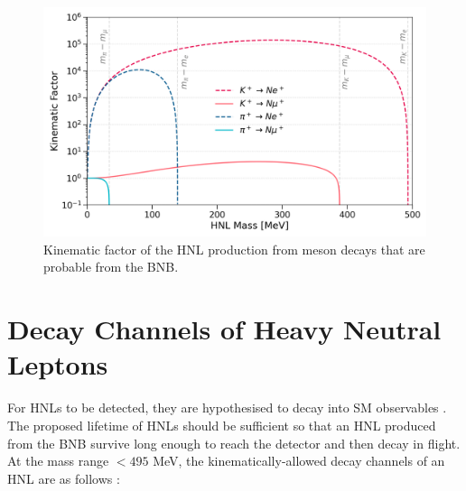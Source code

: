 
\begin{figure}[t] 
\centering    
\includegraphics[width=1.0\textwidth]{kinematics_factor}
\caption[Kinematic Factor of Heavy Neutral Leptons]{
Kinematic factor of the HNL production from meson decays that are probable from the BNB.
}
\label{fig:KinematicsFactor}
\end{figure}

\section{Decay Channels of Heavy Neutral Leptons}
\label{sec2Decay}


For HNLs to be detected, they are hypothesised to decay into SM observables \cite{HNLKelly}.
The proposed lifetime of HNLs should be sufficient so that an HNL produced from the BNB survive long enough to reach the detector and then decay in flight.
At the mass range $< 495$ MeV, the kinematically-allowed decay channels of an HNL are as follows \cite{SBNHNL}:

